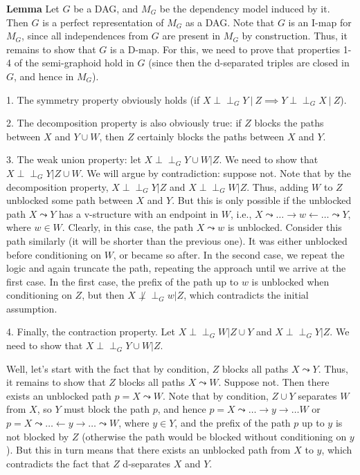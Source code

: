 \documentclass[fleqn]{article}
\newcommand{\indepg}{\perp \!\!\! \perp_G}
\numberwithin{equation}{section}
\numberwithin{theorem}{section}
\numberwithin{figure}{section}
\numberwithin{lemma}{section}
\numberwithin{corollary}{section}
\begin{document}
\textbf{Lemma} Let \( G \) be a DAG, and \( M_G \) be the dependency model induced by it. Then \( G \) is a perfect representation of \( M_G \) as a DAG.
Note that \( G \) is an I-map for \( M_G \), since all independences from \( G \) are present in \( M_G \) by construction. Thus, it remains to show that \( G \) is a D-map. For this, we need to prove that properties 1-4 of the semi-graphoid hold in \( G \) (since then the d-separated triples are closed in \( G \), and hence in \( M_G \)).

1. The symmetry property obviously holds (if \( X \indepg Y \ | \ Z \implies Y \indepg X \ | \ Z \)).

2. The decomposition property is also obviously true: if \( Z \) blocks the paths between \( X \) and \( Y \cup W \), then \( Z \) certainly blocks the paths between \( X \) and \( Y \).

3. The weak union property: let \( X \indepg Y \cup W | Z \). We need to show that \( X \indepg Y | Z \cup W \). We will argue by contradiction: suppose not. Note that by the decomposition property, \( X \indepg Y | Z \) and \( X \indepg W | Z \). Thus, adding \( W \) to \( Z \) unblocked some path between \( X \) and \( Y \). But this is only possible if the unblocked path \( X \leadsto Y \) has a v-structure with an endpoint in \( W \), i.e., \( X \leadsto \ldots \rightarrow w \leftarrow \ldots \leadsto Y \), where \( w \in W \). Clearly, in this case, the path \( X \leadsto w \) is unblocked. Consider this path similarly (it will be shorter than the previous one). It was either unblocked before conditioning on \( W \), or became so after. In the second case, we repeat the logic and again truncate the path, repeating the approach until we arrive at the first case. In the first case, the prefix of the path up to \( w \) is unblocked when conditioning on \( Z \), but then \( X \not \indepg w | Z \), which contradicts the initial assumption.

4. Finally, the contraction property. Let \( X \indepg W | Z \cup Y \) and \( X \indepg Y | Z \). We need to show that \( X \indepg Y \cup W | Z \).

Well, let's start with the fact that by condition, \( Z \) blocks all paths \( X \leadsto Y \). Thus, it remains to show that \( Z \) blocks all paths \( X \leadsto W \). Suppose not. Then there exists an unblocked path \( p = X \leadsto W \). Note that by condition, \( Z \cup Y \) separates \( W \) from \( X \), so \( Y \) must block the path \( p \), and hence \( p = X \leadsto \ldots \rightarrow y \rightarrow \ldots W \) or \( p = X \leadsto \ldots \leftarrow y \rightarrow \ldots \leadsto W \), where \( y \in Y \), and the prefix of the path \( p \) up to \( y \) is not blocked by \( Z \) (otherwise the path would be blocked without conditioning on \( y \)). But this in turn means that there exists an unblocked path from \( X \) to \( y \), which contradicts the fact that \( Z \) d-separates \( X \) and \( Y \).
\end{document}

